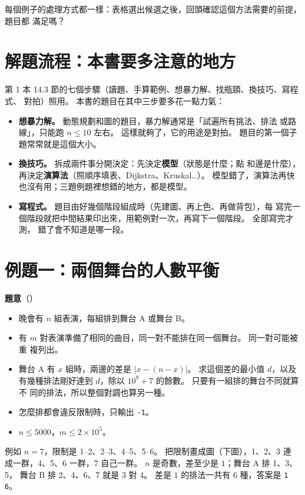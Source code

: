 每個例子的處理方式都一樣：表格選出候選之後，回頭確認這個方法需要的前提，題目都
滿足嗎？

\section{解題流程：本書要多注意的地方}
\label{sec:cap-flow}

第 1 本 14.3 節的七個步驟（讀題、手算範例、想暴力解、找瓶頸、換技巧、寫程式、
對拍）照用。 本書的題目在其中三步要多花一點力氣：

\begin{itemize}
\item \textbf{想暴力解。} 動態規劃和圖的題目，暴力解通常是「試遍所有挑法、排法
或路線」，只能跑 $n \le 10$ 左右。 這樣就夠了，它的用途是對拍。 題目的第一個子
題常常就是這個大小。
\item \textbf{換技巧。} 拆成兩件事分開決定：先決定\textbf{模型}（狀態是什麼；點
和邊是什麼），再決定\textbf{演算法}（照順序填表、Dijkstra、Kruskal\ldots）。
模型錯了，演算法再快也沒有用；三題例題裡想錯的地方，都是模型。
\item \textbf{寫程式。} 題目由好幾個階段組成時（先建圖、再上色、再做背包），每
寫完一個階段就把中間結果印出來，用範例對一次，再寫下一個階段。 全部寫完才測，
錯了會不知道是哪一段。
\end{itemize}

\section{例題一：兩個舞台的人數平衡}
\label{sec:cap-stages}

\textbf{題意}（）

\begin{itemize}
\item 晚會有 $n$ 組表演，每組排到舞台 A 或舞台 B。
\item 有 $m$ 對表演準備了相同的曲目，同一對不能排在同一個舞台。 同一對可能被重
複列出。
\item 舞台 A 有 $x$ 組時，兩邊的差是 $|x - (n - x)|$。 求這個差的最小值 $d$，以及
有幾種排法剛好達到 $d$，除以 $10^9 + 7$ 的餘數。 只要有一組排的舞台不同就算不
同的排法，所以整個對調也算另一種。
\item 怎麼排都會違反限制時，只輸出 \texttt{-1}。
\item $n \le 5000$，$m \le 2 \times 10^5$。
\end{itemize}

例如 $n = 7$，限制是 1--2、2--3、4--5、5--6。 把限制畫成圖（下圖），1、2、3 連
成一群，4、5、6 一群，7 自己一群。 $n$ 是奇數，差至少是 $1$；舞台 A 排 1、3、5，
舞台 B 排 2、4、6、7 就是 $3$ 對 $4$。 差是 $1$ 的排法一共有 $6$ 種，答案是
\texttt{1 6}。

